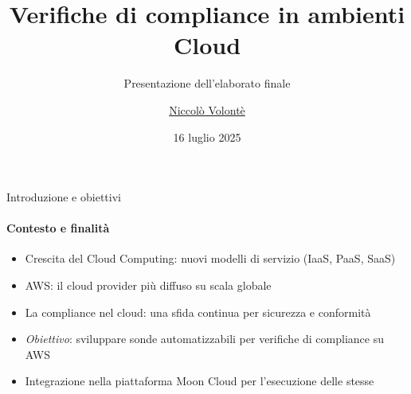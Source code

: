 \documentclass{beamer}
\title{Verifiche di compliance in ambienti Cloud}
\subtitle{Presentazione dell'elaborato finale}
\author{\href{mailto:niccolo.volonte@studenti.unimi.it}{Niccolò Volontè}}
\date{16 luglio 2025}
\begin{document}
\maketitle




\begin{frame}{Introduzione e obiettivi}
    \framesubtitle{Contesto e finalità}
    \begin{itemize}
        \item<1-> Crescita del Cloud Computing: nuovi modelli di servizio (IaaS, PaaS, SaaS)
        \item<2-> AWS: il cloud provider più diffuso su scala globale
        \item<3-> La compliance nel cloud: una sfida continua per sicurezza e conformità
        \item<4-> \emph{Obiettivo}: sviluppare sonde automatizzabili per verifiche di compliance su AWS
        \item<5-> Integrazione nella piattaforma Moon Cloud per l'esecuzione delle stesse
    \end{itemize}
\end{frame}
\end{document}
